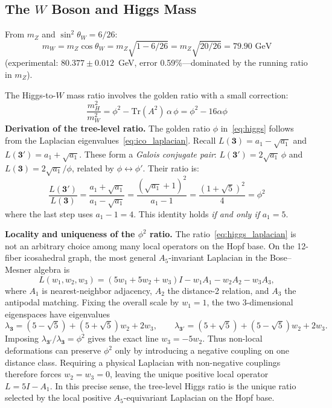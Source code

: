 \documentclass[12pt,a4paper]{article}
\theoremstyle{definition}
\begin{document}
\subsection{The \texorpdfstring{$W$}{W} Boson and Higgs Mass}

From $m_Z$ and $\sin^2\theta_W = 6/26$:
\begin{equation}
m_W = m_Z \cos\theta_W = m_Z \sqrt{1 - 6/26} = m_Z\sqrt{20/26} = 79.90 \text{ GeV}
\end{equation}
(experimental: $80.377 \pm 0.012$~GeV, error 0.59\%---dominated by the running ratio in $m_Z$).

The Higgs-to-$W$ mass ratio involves the golden ratio with a small correction:
\begin{equation}
\boxed{\frac{m_H^2}{m_W^2} = \phi^2 - \mathrm{Tr}(A^2)\,\alpha\,\phi = \phi^2 - 16\alpha\phi}
\label{eq:higgs}
\end{equation}
\textbf{Derivation of the tree-level ratio.}  The golden ratio $\phi$ in~\eqref{eq:higgs} follows from the Laplacian eigenvalues~\eqref{eq:ico_laplacian}.  Recall $L(\mathbf{3}) = a_1 - \sqrt{a_1}$ and $L(\mathbf{3'}) = a_1 + \sqrt{a_1}$.  These form a \emph{Galois conjugate pair}: $L(\mathbf{3'}) = 2\sqrt{a_1}\,\phi$ and $L(\mathbf{3}) = 2\sqrt{a_1}/\phi$, related by $\phi \leftrightarrow \phi'$.  Their ratio is:
\begin{equation}
\frac{L(\mathbf{3'})}{L(\mathbf{3})} = \frac{a_1 + \sqrt{a_1}}{a_1 - \sqrt{a_1}} = \frac{(\sqrt{a_1}+1)^2}{a_1 - 1} = \frac{(1+\sqrt{5})^2}{4} = \phi^2
\label{eq:higgs_laplacian}
\end{equation}
where the last step uses $a_1 - 1 = 4$.  This identity holds \emph{if and only if} $a_1 = 5$.

\textbf{Locality and uniqueness of the $\phi^2$ ratio.}  The ratio~\eqref{eq:higgs_laplacian} is not an arbitrary choice among many local operators on the Hopf base.  On the 12-fiber icosahedral graph, the most general $A_5$-invariant Laplacian in the Bose--Mesner algebra is
\[
L(w_1,w_2,w_3) = (5w_1 + 5w_2 + w_3)I - w_1A_1 - w_2A_2 - w_3A_3,
\]
where $A_1$ is nearest-neighbor adjacency, $A_2$ the distance-2 relation, and $A_3$ the antipodal matching.  Fixing the overall scale by $w_1 = 1$, the two 3-dimensional eigenspaces have eigenvalues
\[
\lambda_{\mathbf{3}} = (5-\sqrt{5}) + (5+\sqrt{5})w_2 + 2w_3, \qquad
\lambda_{\mathbf{3'}} = (5+\sqrt{5}) + (5-\sqrt{5})w_2 + 2w_3.
\]
Imposing $\lambda_{\mathbf{3'}}/\lambda_{\mathbf{3}} = \phi^2$ gives the exact line $w_3 = -5w_2$.  Thus non-local deformations can preserve $\phi^2$ only by introducing a negative coupling on one distance class.  Requiring a physical Laplacian with non-negative couplings therefore forces $w_2 = w_3 = 0$, leaving the unique positive local operator $L = 5I - A_1$.  In this precise sense, the tree-level Higgs ratio is the unique ratio selected by the local positive $A_5$-equivariant Laplacian on the Hopf base.
\end{document}
